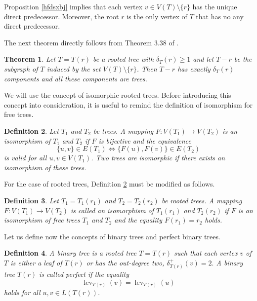 \documentclass{raex}
\newtheorem{thm}{Theorem}[section]
\newtheorem{defn}[thm]{Definition}
\theoremstyle{definition}
\theoremstyle{remark}
\numberwithin{equation}{section}
\begin{document}
Proposition \ref{hfdsxbj} implies that each vertex $v\in V(T)\setminus \{r\}$ has the unique direct predecessor. Moreover, the root $r$ is the only vertex of  $T$ that has no any direct predecessor.


The next theorem directly follows from Theorem 3.38 of \cite[p.~20]{Tutte1966}.

\begin{thm}
    \label{gjl}
Let $T=T(r)$ be a rooted tree with $\delta_T(r)\geq 1$ and let
$T-r$ be the subgraph of $T$ induced by the set
$V(T)\setminus\{r\}$. Then $T-r$ has exactly
$\delta_T(r)$ components and all these components are trees.
\end{thm}







We will use the concept of isomorphic rooted trees. Before introducing this concept into consideration, it is useful to remind the definition of isomorphism for free trees.
\begin{defn}\label{r1}
Let $T_1$ and $T_2$ be trees. A mapping
\(
F : V(T_1) \rightarrow V(T_2)
\)
is an isomorphism of $T_1$ and $T_2$ if $F$ is bijective and the equivalence
\[
\{u,v\}\in E(T_1)
\iff
\{F(u),F(v)\}\in E(T_2)
\]
is valid for all $u,v\in V(T_1)$. Two trees are isomorphic if there exists an isomorphism of these trees.
\end{defn}




For the case of rooted trees, Definition \ref{r1} must be modified as follows.

\begin{defn}\label{wf}
Let $T_1=T_1(r_1)$ and $T_2=T_2(r_2)$ be rooted trees. A mapping
\(
F:V(T_1)\to V(T_2)
\)
is called an isomorphism of $T_1(r_1)$ and $T_2(r_2)$ if $F$ is an isomorphism of free trees $T_1$ and $T_2$ and the equality 
\(
    F(r_1)=r_2
\)
holds.
\end{defn}





Let us define now the concepts of binary trees and perfect binary trees.

\begin{defn}\label{xxetr}
A {\it binary} tree is a rooted tree $T=T(r)$ such that each vertex $v$ of $T$ is either a leaf of $T(r)$ or has the out-degree two, $\delta^+_{T(r)}(v)=2.$
A binary tree $T(r)$ is called {\it perfect} if the equality 
\begin{equation*}
    \operatorname{lev}_{T(r)}(v)=   \operatorname{lev}_{T(r)}(u)
\end{equation*}
holds for all $u,v \in L(T(r))$.
\end{defn}
\end{document}
